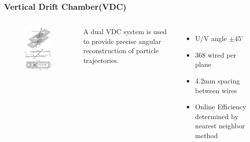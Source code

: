 \documentclass{beamer}
\begin{document}
\begin{frame}
\frametitle{Vertical Drift Chamber(VDC)}
	\begin{columns}
		\begin{figure}
			\includegraphics[width=5cm]{../images/VDC}
		\end{figure}		
		A dual VDC system is used to provide precise angular reconstruction of particle trajectories.
		\begin{itemize}
			\item U/V angle $\pm 45 ^\circ$
			\item 368 wired per plane
			\item 4.2mm spacing between wires
			\item Online Efficiency determined by nearest neighbor method \cite{nim}
		\end{itemize}
	\end{columns}
\end{frame}
\end{document}
